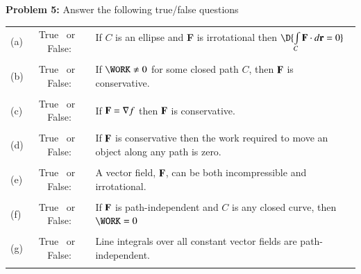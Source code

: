 \documentclass[11pt]{article}
\begin{document}
\thispagestyle{empty}
\newpage
\thispagestyle{empty}

{\bf Problem 5:} Answer the following true/false questions

	\setlength{\extrarowheight}{-0.2cm}
	\begin{tabular}{p{0.2cm}cp{16.2cm}}
		(a) & True \, or \, False: & If $C$ is an ellipse and {\bf F} is irrotational then $\D{\int \limits_{C} {\bf F} \cdot d{\bf r}=0}$\\
		\\
		(b) & True \, or \, False: & If $\WORK \ne 0$ for some closed path $C$, then ${\bf F}$ is conservative.\\
		\\
		(c) & True \, or \, False: & If ${\bf F} = \nabla f$ then ${\bf F}$ is conservative.\\
		\\
		(d) & True \, or \, False: & If ${\bf F}$ is conservative then the work required to move an object along any path is zero.\\
		\\
		(e) & True \, or \, False: & A vector field, ${\bf F}$, can be both incompressible and irrotational.\\
		\\
		(f) & True \, or \, False: & If ${\bf F}$ is path-independent and $C$ is any closed curve, then $\WORK = 0$\\
		\\
		(g) & True \, or \, False: & Line integrals over all constant vector fields are path-independent.\\
		\\
		\hline

\end{tabular}
\end{document}
